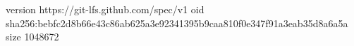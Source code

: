 version https://git-lfs.github.com/spec/v1
oid sha256:bebfc2d8b66e43c86ab625a3e92341395b9caa810f0e347f91a3eab35d8a6a5a
size 1048672
